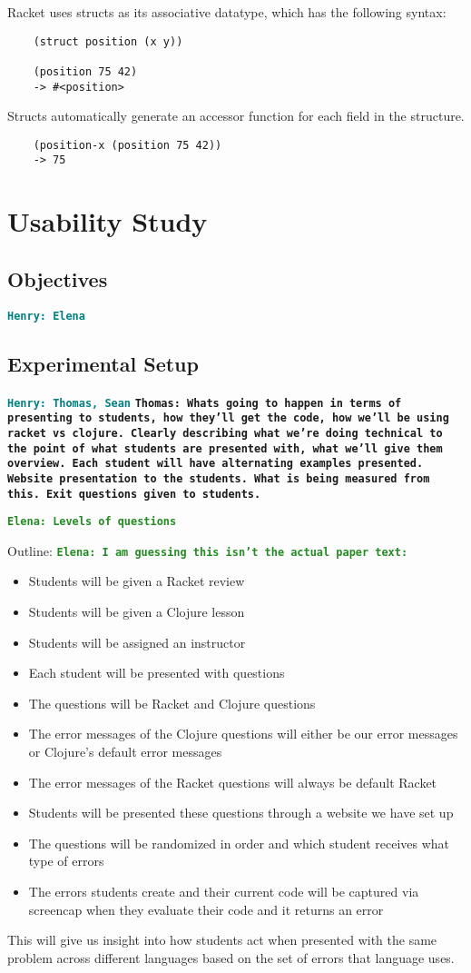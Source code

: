 \documentclass[12pt]{article}
\newcommand{\comment}[1]{{\bf \tt  {#1}}}
\newcommand{\emcomment}[1]{\textcolor{ForestGreen}{\comment{Elena: {#1}}}}
\newcommand{\hfcomment}[1]{\textcolor{Teal}{\comment{Henry: {#1}}}}
\newcommand{\thcomment}[1]{\textcolor{Coquelicot}{\comment{Thomas: {#1}}}}
\begin{document}
Racket uses structs as its associative datatype, which has the following syntax:
\begin{verbatim}
	(struct position (x y))
	
	(position 75 42)
	-> #<position>
\end{verbatim}
Structs automatically generate an accessor function for each field in the structure.
\begin{verbatim}
	(position-x (position 75 42))
	-> 75
\end{verbatim}
\section{Usability Study}\label{sec:study}
	\subsection{Objectives}\label{sec:obj}
	\hfcomment{Elena}
	\subsection{Experimental Setup}\label{sec:setup}
	\hfcomment{Thomas, Sean}
		\thcomment{Whats going to happen in terms of presenting to students, how they'll get the code, how we'll be using racket vs clojure. Clearly describing what we're doing technical to the point of what students are presented with, what we'll give them overview. Each student will have alternating examples presented. Website presentation to the students. What is being measured from this. Exit questions given to students.}

\emcomment{Levels of questions}

Outline: \emcomment{I am guessing this isn't the actual paper text:}
\begin{itemize}
\item Students will be given a Racket review
\item Students will be given a Clojure lesson
\item Students will be assigned an instructor
\item Each student will be presented with questions
\item The questions will be Racket and Clojure questions
\item The error messages of the Clojure questions will either be our error messages or Clojure's default error messages
\item The error messages of the Racket questions will always be default Racket
\item Students will be presented these questions through a website we have set up
\item The questions will be randomized in order and which student receives what type of errors
\item The errors students create and their current code will be captured via screencap when they evaluate their code and it returns an error
\end{itemize}
This will give us insight into how students act when presented with the same problem across different languages based on the set of errors that language uses.
\end{document}
